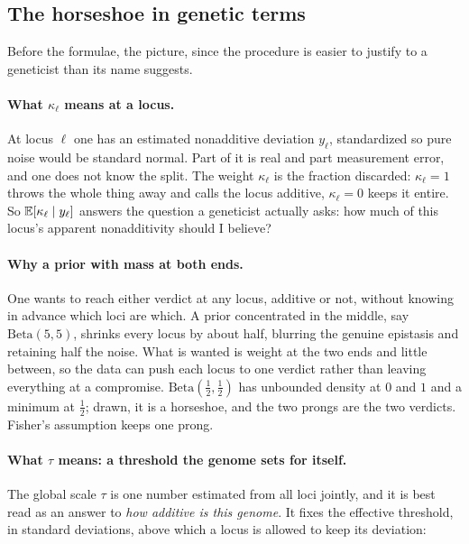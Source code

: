 \subsection{The horseshoe in genetic terms}

Before the formulae, the picture, since the procedure is easier to justify to a geneticist than its
name suggests.

\paragraph{What $\kappa_\ell$ means at a locus.} At locus $\ell$ one has an estimated nonadditive
deviation $y_\ell$, standardized so pure noise would be standard normal. Part of it is real and
part measurement error, and one does not know the split. The weight $\kappa_\ell$ is the fraction
discarded: $\kappa_\ell=1$ throws the whole thing away and calls the locus additive,
$\kappa_\ell=0$ keeps it entire. So $\mathbb{E}[\kappa_\ell\mid y_\ell]$ answers the question a geneticist
actually asks: how much of this locus's apparent nonadditivity should I believe?

\paragraph{Why a prior with mass at both ends.} One wants to reach either verdict at any locus,
additive or not, without knowing in advance which loci are which. A prior concentrated in the
middle, say $\text{Beta}(5,5)$, shrinks every locus by about half, blurring the genuine epistasis
and retaining half the noise. What is wanted is weight at the two ends and little between, so the
data can push each locus to one verdict rather than leaving everything at a compromise.
$\text{Beta}(\tfrac12,\tfrac12)$ has unbounded density at $0$ and $1$ and a minimum at $\tfrac12$;
drawn, it is a horseshoe, and the two prongs are the two verdicts. Fisher's assumption keeps one
prong.

\paragraph{What $\tau$ means: a threshold the genome sets for itself.} The global scale $\tau$ is
one number estimated from all loci jointly, and it is best read as an answer to \emph{how additive
is this genome}. It fixes the effective threshold, in standard deviations, above which a locus is
allowed to keep its deviation:


